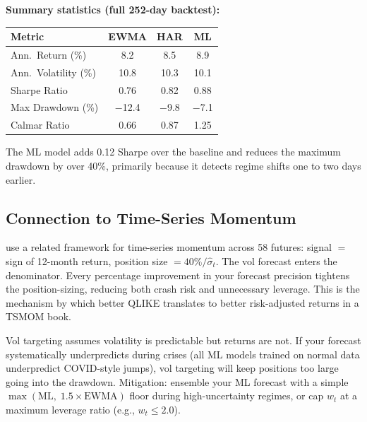 \begin{workedexample}
\medskip
\noindent\textbf{Summary statistics (full 252-day backtest):}

\begin{center}
\begin{tabular}{@{}lccc@{}}
\toprule
Metric & EWMA & HAR & ML \\
\midrule
Ann.\ Return (\%) & 8.2 & 8.5 & 8.9 \\
Ann.\ Volatility (\%) & 10.8 & 10.3 & 10.1 \\
Sharpe Ratio & 0.76 & 0.82 & 0.88 \\
Max Drawdown (\%) & $-$12.4 & $-$9.8 & $-$7.1 \\
Calmar Ratio & 0.66 & 0.87 & 1.25 \\
\bottomrule
\end{tabular}
\end{center}

\noindent The ML model adds 0.12 Sharpe over the baseline and reduces the maximum drawdown by over 40\%, primarily because it detects regime shifts one to two days earlier.
\end{workedexample}

\subsection{Connection to Time-Series Momentum}
\label{subsec:tsmom-connection}

\citet{MoskowitzOoiPedersen2012} use a related framework for time-series momentum across 58 futures: signal $=$ sign of 12-month return, position size $= 40\%/\hat\sigma_t$.
The vol forecast enters the denominator.
Every percentage improvement in your forecast precision tightens the position-sizing, reducing both crash risk and unnecessary leverage.
This is the mechanism by which better QLIKE translates to better risk-adjusted returns in a TSMOM book.

\begin{warning}
Vol targeting assumes volatility is predictable but returns are not.
If your forecast systematically underpredicts during crises (all ML models trained on normal data underpredict COVID-style jumps), vol targeting will keep positions too large going into the drawdown.
Mitigation: ensemble your ML forecast with a simple $\max(\text{ML},\; 1.5 \times \text{EWMA})$ floor during high-uncertainty regimes, or cap $w_t$ at a maximum leverage ratio (e.g., $w_t \leq 2.0$).
\end{warning}

